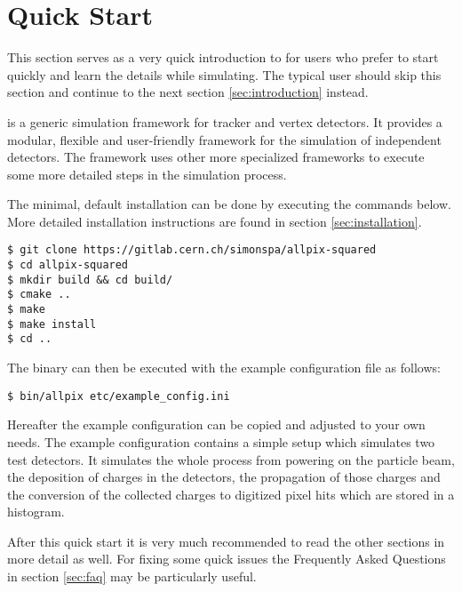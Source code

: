 \section{Quick Start}
This section serves as a very quick introduction to \apsq for users who prefer to start quickly and learn the details while simulating. The typical user should skip this section and continue to the next section \ref{sec:introduction} instead. 

\apsq is a generic simulation framework for tracker and vertex detectors. It provides a modular, flexible and user-friendly framework for the simulation of independent detectors. The framework uses other more specialized frameworks to execute some more detailed steps in the simulation process.

The minimal, default installation can be done by executing the commands below. More detailed installation instructions are found in section \ref{sec:installation}.
\begin{verbatim}
$ git clone https://gitlab.cern.ch/simonspa/allpix-squared
$ cd allpix-squared
$ mkdir build && cd build/
$ cmake ..
$ make
$ make install
$ cd ..
\end{verbatim}
The binary can then be executed with the example configuration file as follows:
\begin{verbatim}
$ bin/allpix etc/example_config.ini
\end{verbatim}

Hereafter the example configuration can be copied and adjusted to your own needs. The example configuration contains a simple setup which simulates two test detectors. It simulates the whole process from powering on the particle beam, the deposition of charges in the detectors, the propagation of those charges and the conversion of the collected charges to digitized pixel hits which are stored in a histogram.

After this quick start it is very much recommended to read the other sections in more detail as well. For fixing some quick issues the Frequently Asked Questions in section \ref{sec:faq} may be particularly useful.
